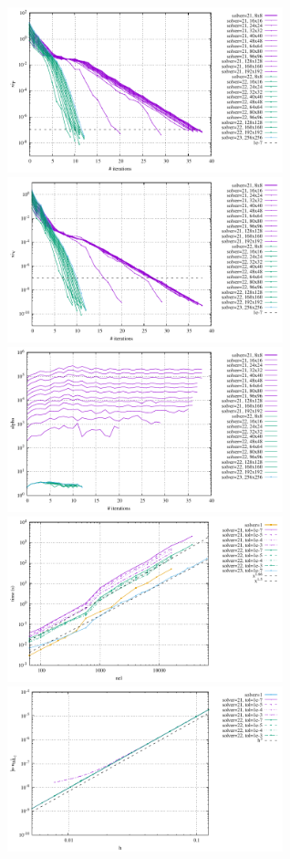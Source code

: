 \begin{center}
\includegraphics[width=8cm]{python_codes/fieldstone_147/RESULTS/L2/uzawa3/solver_convergence_P.pdf}
\includegraphics[width=8cm]{python_codes/fieldstone_147/RESULTS/L2/uzawa3/solver_convergence_V.pdf} \\
\includegraphics[width=8cm]{python_codes/fieldstone_147/RESULTS/L2/uzawa3/solver_convergence_alpha.pdf}
\includegraphics[width=8cm]{python_codes/fieldstone_147/RESULTS/L2/uzawa3/time.pdf}\\
\includegraphics[width=8cm]{python_codes/fieldstone_147/RESULTS/L2/uzawa3/errorsV.pdf}

\end{center}
